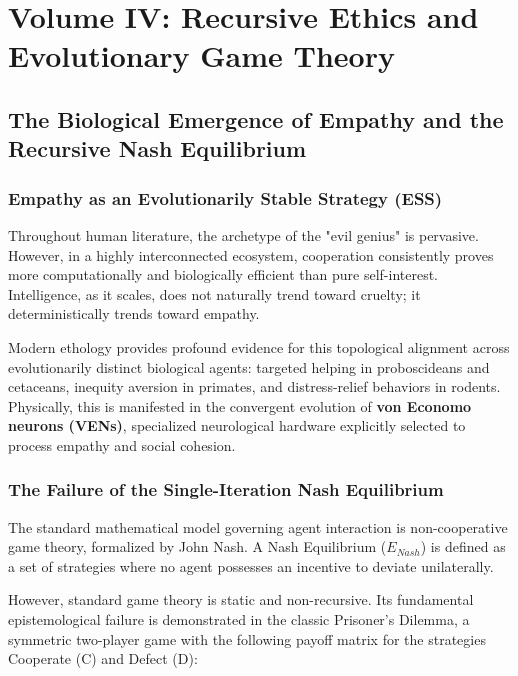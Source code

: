 \documentclass[12pt,openany]{book}
\begin{document}
\part[Volume IV]{Volume IV: Recursive Ethics and Evolutionary Game Theory}

\chapter{The Biological Emergence of Empathy and the Recursive Nash Equilibrium}

\section{Empathy as an Evolutionarily Stable Strategy (ESS)}
Throughout human literature, the archetype of the "evil genius" is pervasive. However, in a highly interconnected ecosystem, cooperation consistently proves more computationally and biologically efficient than pure self-interest. Intelligence, as it scales, does not naturally trend toward cruelty; it deterministically trends toward empathy.

Modern ethology provides profound evidence for this topological alignment across evolutionarily distinct biological agents: targeted helping in proboscideans and cetaceans, inequity aversion in primates, and distress-relief behaviors in rodents. Physically, this is manifested in the convergent evolution of \textbf{von Economo neurons (VENs)}, specialized neurological hardware explicitly selected to process empathy and social cohesion.

\section{The Failure of the Single-Iteration Nash Equilibrium}
The standard mathematical model governing agent interaction is non-cooperative game theory, formalized by John Nash. A Nash Equilibrium ($E_{Nash}$) is defined as a set of strategies where no agent possesses an incentive to deviate unilaterally. 

However, standard game theory is static and non-recursive. Its fundamental epistemological failure is demonstrated in the classic Prisoner's Dilemma, a symmetric two-player game with the following payoff matrix for the strategies Cooperate (C) and Defect (D):
\end{document}
